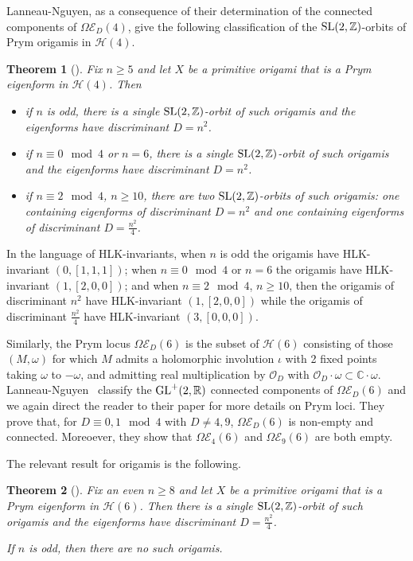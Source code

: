 \documentclass[a4paper,11pt]{amsart}
\numberwithin{equation}{section}
\numberwithin{figure}{section}
\numberwithin{table}{section}
\newtheorem{theorem}{Theorem}[section]
\newcommand{\calH}{\mathcal{H}}
\newcommand{\C}{\mathbb{C}}
\newcommand{\Z}{\mathbb{Z}}
\newcommand{\R}{\mathbb{R}}
\DeclareMathOperator{\SL}{{\rm{SL}}}
\DeclareMathOperator{\GL}{{\rm{GL}}}
\begin{document}
Lanneau-Nguyen, as a consequence of their determination of the connected components of $\Omega\mathcal{E}_{D}(4)$, give the following classification of the $\SL(2,\Z)$-orbits of Prym origamis in $\calH(4)$.

\begin{theorem}[{\cite[Proposition B.1 and Corollary B.2]{LN14}}]
    Fix $n\geq 5$ and let $X$ be a primitive origami that is a Prym eigenform in $\calH(4)$. Then
    \begin{itemize}
        \item if $n$ is odd, there is a single $\SL(2,\Z)$-orbit of such origamis and the eigenforms have discriminant $D = n^{2}$.
        \item if $n\equiv 0\mod 4$ or $n = 6$, there is a single $\SL(2,\Z)$-orbit of such origamis and the eigenforms have discriminant $D = n^{2}$.
        \item if $n\equiv 2\mod 4$, $n\geq 10$, there are two $\SL(2,\Z)$-orbits of such origamis: one containing eigenforms of discriminant $D = n^{2}$ and one containing eigenforms of discriminant $D = \frac{n^{2}}{4}$.
    \end{itemize}
\end{theorem}

In the language of HLK-invariants, when $n$ is odd the origamis have HLK-invariant $(0,[1,1,1])$; when $n\equiv 0\mod 4$ or $n = 6$ the origamis have HLK-invariant $(1,[2,0,0])$; and when $n\equiv 2\mod 4$, $n\geq 10$, then the origamis of discriminant $n^2$ have HLK-invariant $(1,[2,0,0])$ while the origamis of discriminant $\frac{n^{2}}{4}$ have HLK-invariant $(3,[0,0,0])$.

Similarly, the Prym locus $\Omega\mathcal{E}_{D}(6)$ is the subset of $\calH(6)$ consisting of those $(M,\omega)$ for which $M$ admits a holomorphic involution $\iota$ with 2 fixed points taking $\omega$ to $-\omega$, and admitting real multiplication by $\mathcal{O}_{D}$ with $\mathcal{O}_{D}\cdot\omega\subset\C\cdot\omega$. Lanneau-Nguyen~\cite{LN20} classify the $\GL^{+}(2,\R)$ connected components of $\Omega\mathcal{E}_{D}(6)$ and we again direct the reader to their paper for more details on Prym loci. They prove that, for $D\equiv 0,1\!\!\mod\! 4$ with $D\neq 4,9$,  $\Omega\mathcal{E}_{D}(6)$ is non-empty and connected. Moreoever, they show that $\Omega\mathcal{E}_{4}(6)$ and $\Omega\mathcal{E}_{9}(6)$ are both empty.

The relevant result for origamis is the following.

\begin{theorem}[{\cite[Theorem 1.2]{LN20}}]
    Fix an even $n\geq 8$ and let $X$ be a primitive origami that is a Prym eigenform in $\calH(6)$. Then there is a single $\SL(2,\Z)$-orbit of such origamis and the eigenforms have discriminant $D = \frac{n^{2}}{4}$.

    If $n$ is odd, then there are no such origamis.
\end{theorem}
\end{document}
